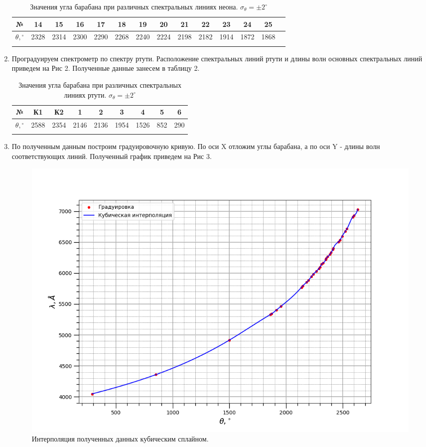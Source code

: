 \documentclass[a4paper, 12pt]{article}%
\begin{document}
\begin{enumerate}
\begin{longtable}{|c|c|c|c|c|c|c|c|c|c|c|c|c|c|}
			\hline 
			
			№ & 14 & 15 & 16 & 17 & 18 & 19 & 20 & 21 & 22 & 23 & 24 & 25 &  \\ \hline
			$\theta, {}^\circ$ & 2328 & 2314 & 2300 & 2290 & 2268 & 2240 & 2224 & 2198 & 2182 & 1914 & 1872 & 1868 &  \\ \hline
			
			\caption{Значения угла барабана при различных спектральных линиях неона. $\sigma_{\theta} = \pm2^\circ$}
		\end{longtable}
	
		\item Проградуируем спектрометр по спектру ртути. Расположение спектральных линий ртути и длины волн основных спектральных линий приведем на Рис 2. Полученные данные занесем в таблицу 2.
		
		\begin{longtable}{|c|c|c|c|c|c|c|c|c|}
			\hline
			№ & К1 & К2 & 1 & 2 & 3 & 4 & 5 & 6  \\ \hline
			$\theta, {}^\circ$ & 2588 & 2354 & 2146 & 2136 & 1954 & 1526 & 852 & 290 \\ \hline
			
			\caption{Значения угла барабана при различных спектральных линиях ртути. $\sigma_{\theta} = \pm2^\circ$}
		\end{longtable}
		
		
		\item По полученным данным построим градуировочную кривую. По оси X отложим углы барабана, а по оси Y - длины волн соответствующих линий. Полученный график приведем на Рис 3. 
		
		\begin{figure}[H]
			\centering
			\includegraphics[width=1.1\linewidth]{interpol}
			\caption{Интерполяция полученных данных кубическим сплайном.}
		\end{figure}
	

\end{enumerate}
\end{document}
